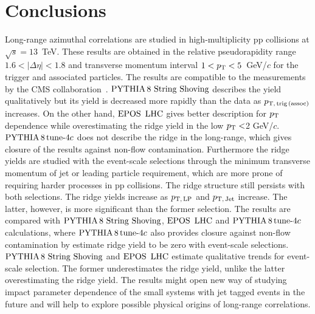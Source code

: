 
\section{Conclusions}
\label{sec:summary}
Long-range azimuthal correlations are studied in high-multiplicity pp collisions at $\sqrt{s} = 13$~TeV. These results are obtained in the relative pseudorapidity range $1.6 < |\Delta\eta| < 1.8$ and transverse momentum interval $1 < p_\mathrm{T} < 5$~GeV/$c$ for the trigger and associated particles. 
The results are compatible to the measurements by the CMS collaboration~\cite{Khachatryan:2015lva}.
${\mathrm{PYTHIA}\,8~\mathrm{String}~}\mathrm{Shoving}$ describes the yield qualitatively but its yield is decreased more rapidly than the data as $p_\mathrm{T,\,trig\,(assoc)}$ increases. On the other hand, ${\mathrm{EPOS}\,~\mathrm{LHC}}$ gives better description for $p_\mathrm{T}$ dependence while overestimating the ridge yield in the low $p_\mathrm{T}<$2 GeV/$c$. $\mathrm{PYTHIA}\,8\,\mathrm{tune}{\text -}4c$ does not describe the ridge in the long-range, which gives closure of the results against non-flow contamination.
Furthermore the ridge yields are studied with the event-scale selections through the minimum transverse momentum of jet or leading particle requirement, which are more prone of requiring harder processes in pp collisions. 
The ridge structure still persists with both selections. The ridge yields increase as $p_\mathrm{T,\,LP}$ and $p_\mathrm{T,\,Jet}$ increase. The latter, however, is more significant than the former selection. The results are compared with ${\mathrm{PYTHIA}\,8~\mathrm{String}~}\mathrm{Shoving}$, ${\mathrm{EPOS}\,~\mathrm{LHC}}$ and $\mathrm{PYTHIA}\,8\,\mathrm{tune}{\text -}4c$ calculations, where $\mathrm{PYTHIA}\,8\,\mathrm{tune}{\text -}4c$ also provides closure against non-flow contamination by estimate ridge yield to be zero with event-scale selections. ${\mathrm{PYTHIA}\,8~\mathrm{String}~}\mathrm{Shoving}$ and ${\mathrm{EPOS}\,~\mathrm{LHC}}$ estimate qualitative trends for event-scale selection. The former underestimates the ridge yield, unlike the latter overestimating the ridge yield.
The results might open new way of studying impact parameter dependence of the small systems with jet tagged events in the future and will help to explore possible physical origins of long-range correlations.